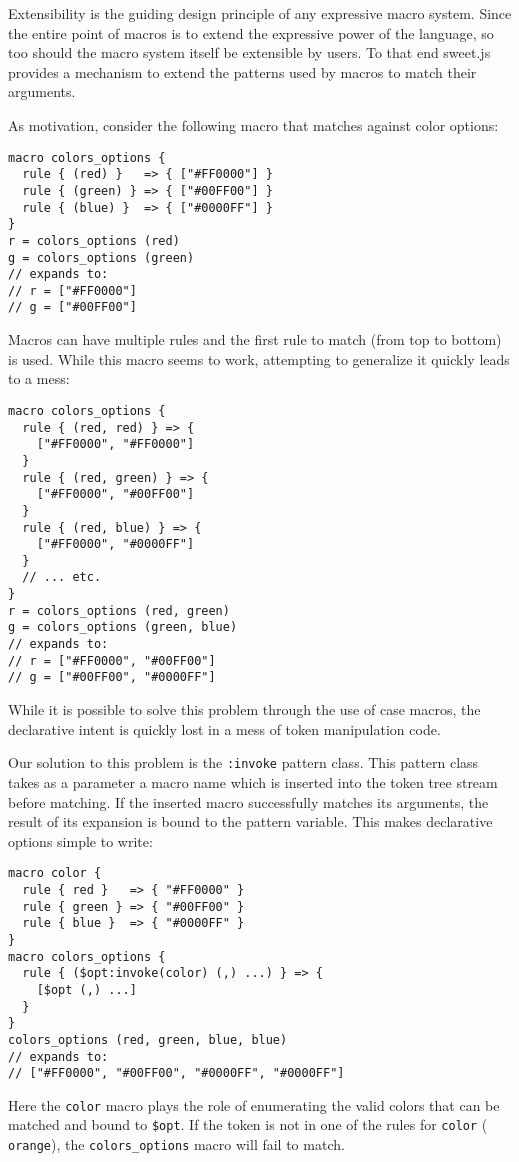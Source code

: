 \documentclass[preprint,10pt]{sigplanconf}
\begin{document}
Extensibility is the guiding design principle of any expressive macro
system. Since the entire point of macros is to extend the expressive
power of the language, so too should the macro system itself be
extensible by users. To that end sweet.js provides a mechanism to
extend the patterns used by macros to match their arguments.

As motivation, consider the following macro that matches against
color options:
\begin{lstlisting}
macro colors_options {
  rule { (red) }   => { ["#FF0000"] }
  rule { (green) } => { ["#00FF00"] }
  rule { (blue) }  => { ["#0000FF"] }
}
r = colors_options (red)
g = colors_options (green)
// expands to:
// r = ["#FF0000"]
// g = ["#00FF00"]
\end{lstlisting}
Macros can have multiple rules and the first rule to match (from top
to bottom) is used. While this macro seems to work, attempting to
generalize it quickly leads to a mess:
\begin{lstlisting}
macro colors_options {
  rule { (red, red) } => {
    ["#FF0000", "#FF0000"]
  }
  rule { (red, green) } => {
    ["#FF0000", "#00FF00"]
  }
  rule { (red, blue) } => {
    ["#FF0000", "#0000FF"]
  }
  // ... etc.
}
r = colors_options (red, green)
g = colors_options (green, blue)
// expands to:
// r = ["#FF0000", "#00FF00"]
// g = ["#00FF00", "#0000FF"]
\end{lstlisting}
While it is possible to solve this problem through the use of case
macros, the declarative intent is quickly lost in a mess of 
token manipulation code.

Our solution to this problem is the \verb!:invoke! pattern class.
This pattern class takes as a parameter a macro name which is inserted
into the token tree stream before matching. If the inserted macro
successfully matches its arguments, the result of its expansion is
bound to the pattern variable. This makes declarative options simple
to write:
\begin{lstlisting}
macro color {
  rule { red }   => { "#FF0000" }
  rule { green } => { "#00FF00" }
  rule { blue }  => { "#0000FF" }
}
macro colors_options {
  rule { ($opt:invoke(color) (,) ...) } => { 
    [$opt (,) ...]
  }
}
colors_options (red, green, blue, blue)
// expands to:
// ["#FF0000", "#00FF00", "#0000FF", "#0000FF"]
\end{lstlisting}
Here the \verb!color! macro plays the role of enumerating the
valid colors that can be matched and bound to \verb!$opt!.
If the token is not in one of the rules for \verb!color! (\eg
\verb!orange!), the \verb!colors_options! macro will fail to match.
\end{document}
